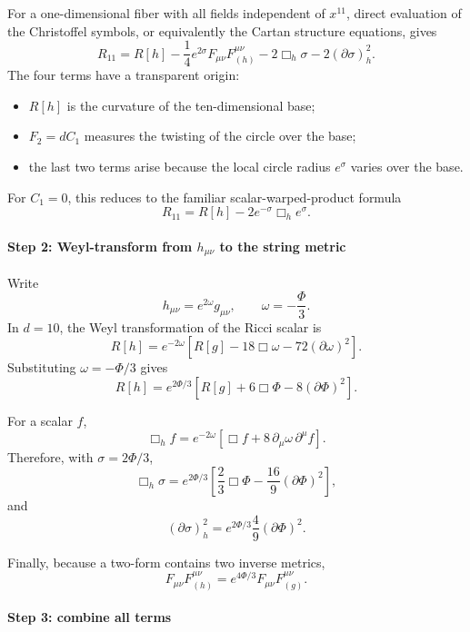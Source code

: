 \documentclass[
  10pt,
  a4paper,
  openany]{book}
\providecommand{\tightlist}{%
  \setlength{\itemsep}{0pt}\setlength{\parskip}{0pt}}
\begin{document}
For a one-dimensional fiber with all fields independent of \(x^{11}\),
direct evaluation of the Christoffel symbols, or equivalently the Cartan
structure equations, gives \[
\boxed{
R_{11}
=R[h]
-\frac14e^{2\sigma}F_{\mu\nu}F^{\mu\nu}_{(h)}
-2\Box_h\sigma
-2(\partial\sigma)^2_h
}.
\] The four terms have a transparent origin:

\begin{itemize}
\tightlist
\item
  \(R[h]\) is the curvature of the ten-dimensional base;
\item
  \(F_2=dC_1\) measures the twisting of the circle over the base;
\item
  the last two terms arise because the local circle radius \(e^\sigma\)
  varies over the base.
\end{itemize}

For \(C_1=0\), this reduces to the familiar scalar-warped-product
formula \[
R_{11}
=R[h]-2e^{-\sigma}\Box_h e^\sigma.
\]

\paragraph{\texorpdfstring{Step 2: Weyl-transform from \(h_{\mu\nu}\) to
the string
metric}{Step 2: Weyl-transform from h\_\{\textbackslash mu\textbackslash nu\} to the string metric}}\label{step-2-weyl-transform-from-h_munu-to-the-string-metric}

Write \[
h_{\mu\nu}=e^{2\omega}g_{\mu\nu},
\qquad
\omega=-\frac{\Phi}{3}.
\] In \(d=10\), the Weyl transformation of the Ricci scalar is \[
R[h]
=e^{-2\omega}
\left[
R[g]
-18\Box\omega
-72(\partial\omega)^2
\right].
\] Substituting \(\omega=-\Phi/3\) gives \[
\boxed{
R[h]
=e^{2\Phi/3}
\left[
R[g]
+6\Box\Phi
-8(\partial\Phi)^2
\right]
}.
\]

For a scalar \(f\), \[
\Box_hf
=e^{-2\omega}
\left[
\Box f+8\,\partial_\mu\omega\,\partial^\mu f
\right].
\] Therefore, with \(\sigma=2\Phi/3\), \[
\boxed{
\Box_h\sigma
=e^{2\Phi/3}
\left[
\frac23\Box\Phi
-\frac{16}{9}(\partial\Phi)^2
\right]
},
\] and \[
\boxed{
(\partial\sigma)^2_h
=e^{2\Phi/3}
\frac49(\partial\Phi)^2
}.
\]

Finally, because a two-form contains two inverse metrics, \[
F_{\mu\nu}F^{\mu\nu}_{(h)}
=e^{4\Phi/3}F_{\mu\nu}F^{\mu\nu}_{(g)}.
\]

\paragraph{Step 3: combine all terms}\label{step-3-combine-all-terms}
\end{document}
